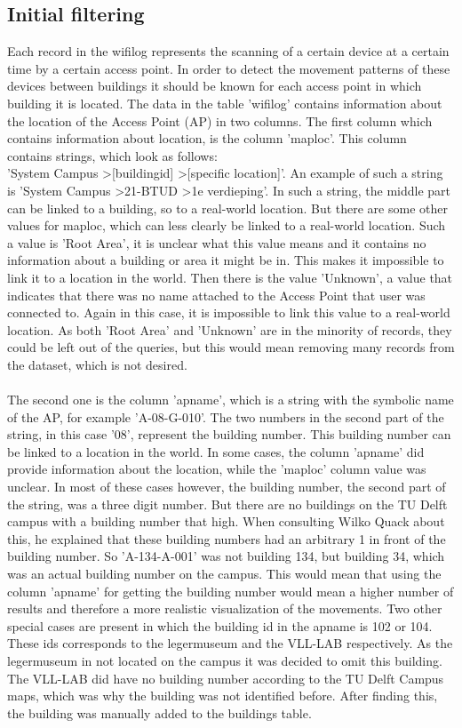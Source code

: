 \subsection{Initial filtering}\label{initialfiltering}
Each record in the wifilog represents the scanning of a certain device at a certain time by a certain access point. In order to detect the movement patterns of these devices between buildings it should be known for each access point in which building it is located. The data in the table 'wifilog' contains information about the location of the Access Point (AP) in two columns. The first column which contains information about location, is the column 'maploc'. This column contains strings, which look as follows: 
\\
'System Campus \textgreater [buildingid] \textgreater [specific location]'. An example of such a string is 'System Campus \textgreater 21-BTUD \textgreater 1e verdieping'. In such a string, the middle part can be linked to a building, so to a real-world location. But there are some other values for maploc, which can less clearly be linked to a real-world location. Such a value is 'Root Area', it is unclear what this value means and it contains no information about a building or area it might be in. This makes it impossible to link it to a location in the world. Then there is the value 'Unknown', a value that indicates that there was no name attached to the Access Point that user was connected to. Again in this case, it is impossible to link this value to a real-world location. As both 'Root Area' and 'Unknown' are in the minority of records, they could be left out of the queries, but this would mean removing many records from the dataset, which is not desired.
\\\\
The second one is the column 'apname', which is a string with the symbolic name of the AP, for example 'A-08-G-010'. The two numbers in the second part of the string, in this case '08', represent the building number. This building number can be linked to a location in the world. In some cases, the column 'apname' did provide information about the location, while the 'maploc' column value was unclear. In most of these cases however, the building number, the second part of the string, was a three digit number. But there are no buildings on the TU Delft campus with a building number that high. When consulting Wilko Quack about this, he explained that these building numbers had an arbitrary 1 in front of the building number. So 'A-134-A-001' was not building 134, but building 34, which was an actual building number on the campus. This would mean that using the column 'apname' for getting the building number would mean a higher number of results and therefore a more realistic visualization of the movements. Two other special cases are present in which the building id in the apname is 102 or 104. These ids corresponds to the legermuseum and the VLL-LAB respectively. As the legermuseum in not located on the campus it was decided to omit this building. The VLL-LAB did have no building number according to the TU Delft Campus maps, which was why the building was not identified before. After finding this, the building was manually added to the buildings table.
